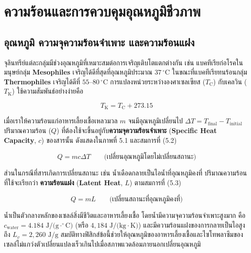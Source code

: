 \clearpage

\chapter{ความร้อนและการควบคุมอุณหภูมิชีวภาพ}

\section{อุณหภูมิ ความจุความร้อนจำเพาะ และความร้อนแฝง}


จุลินทรีย์แต่ละกลุ่มมีช่วงอุณหภูมิที่เหมาะสมต่อการเจริญเติบโตแตกต่างกัน เช่น แบคทีเรียก่อโรคในมนุษย์กลุ่ม \textbf{Mesophiles} เจริญได้ดีที่สุดที่อุณหภูมิประมาณ $37\,^\circ\text{C}$ ในขณะที่แบคทีเรียทนร้อนกลุ่ม \textbf{Thermophiles} เจริญได้ดีที่ $55\text{--}80\,^\circ\text{C}$ การแปลงหน่วยระหว่างองศาเซลเซียส ($T_{\text{C}}$) กับเคลวิน ($T_{\text{K}}$) ใช้ความสัมพันธ์อย่างง่ายคือ

\begin{equation}
    T_{\text{K}} = T_{\text{C}} + 273.15
\end{equation}

เมื่อเราให้ความร้อนแก่อาหารเลี้ยงเชื้อเหลวมวล $m$ จนมีอุณหภูมิเปลี่ยนไป $\Delta T = T_{\text{final}} - T_{\text{initial}}$ ปริมาณความร้อน ($Q$) ที่ต้องใช้จะขึ้นอยู่กับ\textbf{ความจุความร้อนจำเพาะ} (\textbf{Specific Heat Capacity}, $c$) ของสารนั้น ดังแสดงใน\mbox{ภาพที่} 5.1 และสมการที่ (5.2)

\begin{equation}
    Q = m c \Delta T \qquad \text{(เปลี่ยนอุณหภูมิโดยไม่เปลี่ยนสถานะ)}
\end{equation}

ส่วนในกรณีที่สารเกิดการเปลี่ยนสถานะ เช่น น้ำเดือดกลายเป็นไอน้ำที่อุณหภูมิคงที่ ปริมาณความร้อนที่ใช้จะเรียกว่า \textbf{ความร้อนแฝง} (\textbf{Latent Heat}, $L$) ตามสมการที่ (5.3)

\begin{equation}
    Q = m L \qquad \text{(เปลี่ยนสถานะที่อุณหภูมิคงที่)}
\end{equation}

น้ำเป็นตัวกลางหลักของเซลล์สิ่งมีชีวิตและอาหารเลี้ยงเชื้อ โดยน้ำมีความจุความร้อนจำเพาะสูงมาก คือ $c_{\text{water}} = 4.184\text{ J/(g}\cdot^\circ\text{C)}$ (หรือ $4{,}184\text{ J/(kg}\cdot\text{K)}$) และมีความร้อนแฝงของการกลายเป็นไอสูงถึง $L_v = 2{,}260\text{ J/g}$ สมบัติทางฟิสิกส์ข้อนี้ช่วยให้อุณหภูมิของอาหารเลี้ยงเชื้อและไซโทพลาซึมของเซลล์ไม่แกว่งตัวเปลี่ยนแปลงเร็วเกินไปเมื่อสภาพแวดล้อมภายนอกเปลี่ยนอุณหภูมิ


